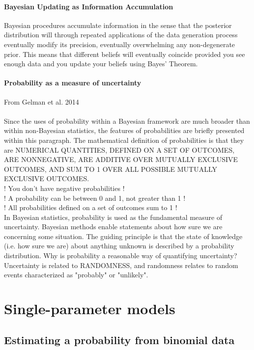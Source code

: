 \documentclass {article}
\begin{document}
\paragraph{Bayesian Updating as Information Accumulation} 
Bayesian procedures accumulate information in the sense that the posterior distribution will through repeated applications of the data generation process eventually modify its precision, eventually overwhelming any non-degenerate prior. 
This means that different beliefs will eventually coincide provided you see enough data and you update your beliefs using Bayes' Theorem. 

\paragraph {Probability as a measure of uncertainty}
From Gelman et al. 2014
\\
\\
Since the uses of probability within a Bayesian framework are much broader than within non-Bayesian statistics, the features of probabilities are briefly presented within this paragraph. The mathematical definition of probabilities is that they are NUMERICAL QUANTITIES, DEFINED ON A SET OF OUTCOMES, ARE NONNEGATIVE, ARE ADDITIVE OVER MUTUALLY EXCLUSIVE OUTCOMES, AND SUM TO 1 OVER ALL POSSIBLE MUTUALLY EXCLUSIVE OUTCOMES.         \\ 
! You don't have negative probabilities ! \\
! A probability can be between 0 and 1, not greater than 1 !\\
! All probabilities defined on a set of outcomes sum to 1 !   \\
In Bayesian statistics, probability is used as the fundamental measure of uncertainty. 
Bayesian methods enable statements about how sure we are concerning some situation.
 The guiding principle is that the state of knowledge (i.e. how sure we are) about anything unknown is described by a probability distribution.
Why is probability a reasonable way of quantifying uncertainty? Uncertainty is related to RANDOMNESS, and randomness relates to random events characterized as "probably" or "unlikely".

    
\section {Single-parameter models}     

\subsection{Estimating a probability from binomial data}
\end{document}
